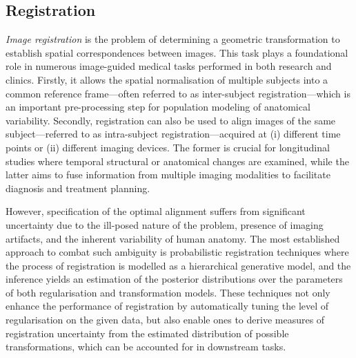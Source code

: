 \subsection*{Registration}
\textit{Image registration} is the problem of determining a geometric transformation to establish spatial correspondences between images. This task plays a foundational role in numerous image-guided medical tasks \cite{maintz1998survey,glocker2011deformable,sotiras2013deformable} performed in both research and clinics. Firstly, it allows the spatial normalisation of multiple subjects into a common reference frame---often referred to as inter-subject registration---which is an important pre-processing step for population modeling of anatomical variability. Secondly, registration can also be used to align images of the same subject---referred to as intra-subject registration---acquired at (i) different time points or (ii) different imaging devices. The former is crucial for longitudinal studies where temporal structural or anatomical changes are examined, while the latter aims to fuse information from multiple imaging modalities to facilitate diagnosis and treatment planning. 

However, specification of the optimal alignment suffers from significant uncertainty due to the ill-posed nature of the problem, presence of imaging artifacts, and the inherent variability of human anatomy. The most established approach to combat such ambiguity is probabilistic registration techniques \cite{van2008encoding,risholm2010summarizing,cobzas2011random,lotfi2013improving,simpson2012probabilistic,risholm2013bayesian,popuri2013variational,zhang2013bayesian,wassermann2014probabilistic,simpson2015probabilistic,heinrich2016deformable,le2016quantifying} where the process of registration is modelled as a hierarchical generative model, and the inference yields an estimation of the posterior distributions over the parameters of both regularisation and transformation models. These techniques not only enhance the performance of registration by automatically tuning the level of regularisation on the given data, but also enable ones to derive measures of registration uncertainty from the estimated distribution of possible transformations, which can be accounted for in downstream tasks.

